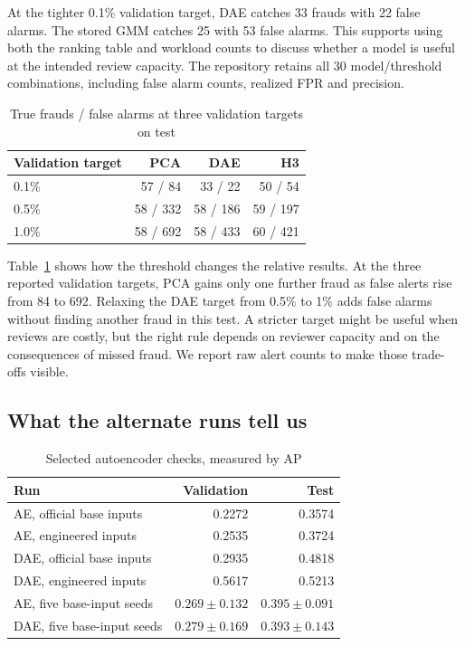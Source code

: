 At the tighter 0.1\% validation target, DAE catches 33 frauds with 22 false alarms. The stored GMM catches 25 with 53 false alarms. This supports using both the ranking table and workload counts to discuss whether a model is useful at the intended review capacity. The repository retains all 30 model/threshold combinations, including false alarm counts, realized FPR and precision.


\begin{table}[t]
\centering
\caption{True frauds / false alarms at three validation targets on test}
\label{tab:budget-sweep-short}
\small
\begin{tabular}{lrrr}
\toprule
Validation target & PCA & DAE & H3 \\
\midrule
0.1\% & 57 / 84 & 33 / 22 & 50 / 54 \\
0.5\% & 58 / 332 & 58 / 186 & 59 / 197 \\
1.0\% & 58 / 692 & 58 / 433 & 60 / 421 \\
\bottomrule
\end{tabular}
\end{table}

Table~\ref{tab:budget-sweep-short} shows how the threshold changes the relative results. At the three reported validation targets, PCA gains only one further fraud as false alerts rise from 84 to 692. Relaxing the DAE target from 0.5\% to 1\% adds false alarms without finding another fraud in this test. A stricter target might be useful when reviews are costly, but the right rule depends on reviewer capacity and on the consequences of missed fraud. We report raw alert counts to make those trade-offs visible.

\subsection{What the alternate runs tell us}
\begin{table}[t]
\centering
\caption{Selected autoencoder checks, measured by AP}
\label{tab:checked-variants}
\small
\begin{tabular}{lrr}
\toprule
Run & Validation & Test \\
\midrule
AE, official base inputs & 0.2272 & 0.3574 \\
AE, engineered inputs & 0.2535 & 0.3724 \\
DAE, official base inputs & 0.2935 & 0.4818 \\
DAE, engineered inputs & 0.5617 & 0.5213 \\
AE, five base-input seeds & $0.269\pm0.132$ & $0.395\pm0.091$ \\
DAE, five base-input seeds & $0.279\pm0.169$ & $0.393\pm0.143$ \\
\bottomrule
\end{tabular}
\end{table}

